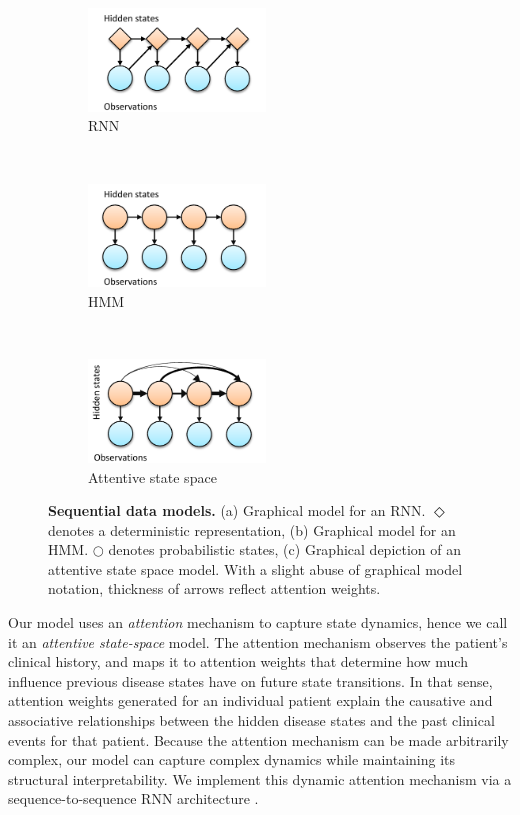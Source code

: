 \documentclass [PhD] {uclathes}
\begin{document}
\begin{figure}[t!] 
    \centering
    \begin{subfigure}[t]{0.32\textwidth}
        \centering
        \includegraphics[width=1.85in]{ch5Fig1b.pdf}
        \caption{\footnotesize RNN}
				\label{fig1a}
    \end{subfigure}%
    ~ 
    \begin{subfigure}[t]{0.32\textwidth}
        \centering
        \includegraphics[width=1.85in]{ch5Fig1a.pdf}
        \caption{\footnotesize HMM}
				\label{fig1b}
    \end{subfigure}
		 ~ 
    \begin{subfigure}[t]{0.32\textwidth}
        \centering
        \includegraphics[width=1.85in]{ch5Fig1c.pdf}
        \caption{\footnotesize Attentive state space}
				\label{fig1c}
    \end{subfigure}
    \caption{{\bf Sequential data models.} (a) Graphical model for an RNN. $\Diamond$ denotes a deterministic representation, (b) Graphical model for an HMM. $\bigcirc$ denotes probabilistic states, (c) Graphical depiction of an attentive state space model. With a slight abuse of graphical model notation, thickness of arrows reflect attention weights.}
\end{figure}

Our model uses an {\it attention} mechanism to capture state dynamics, hence we call it an {\it attentive state-space} model. The attention mechanism observes the patient's clinical history, and maps it to attention weights that determine how much influence previous disease states have on future state transitions. In that sense, attention weights generated for an individual patient explain the causative and associative relationships between the hidden disease states and the past clinical events for that patient. Because the attention mechanism can be made arbitrarily complex, our model can capture complex dynamics while maintaining its structural interpretability. We implement this dynamic attention mechanism via a sequence-to-sequence RNN architecture \cite{sutskever2014sequence}.  
\end{document}
